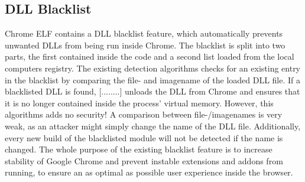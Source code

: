 \subsection{DLL Blacklist}
Chrome ELF contains a DLL blacklist feature, which automatically prevents unwanted DLLs from being run inside Chrome. The blacklist is split into two parts, the first contained inside the code and a second list loaded from the local computers registry. The existing detection algorithms checks for an existing entry in the blacklist by comparing the file- and imagename of the loaded DLL file. If a blacklisted DLL is found, [........] unloads the DLL from Chrome and ensures that it is no longer contained inside the process' virtual memory. However, this algorithms adds no security! A comparison between file-/imagenames is very weak, as an attacker might simply change the name of the DLL file. Additionally, every new build of the blacklisted module will not be detected if the name is changed. The whole purpose of the existing blacklist feature is to increase stability of Google Chrome and prevent instable extensions and addons from running, to ensure an as optimal as possible user experience inside the browser.
